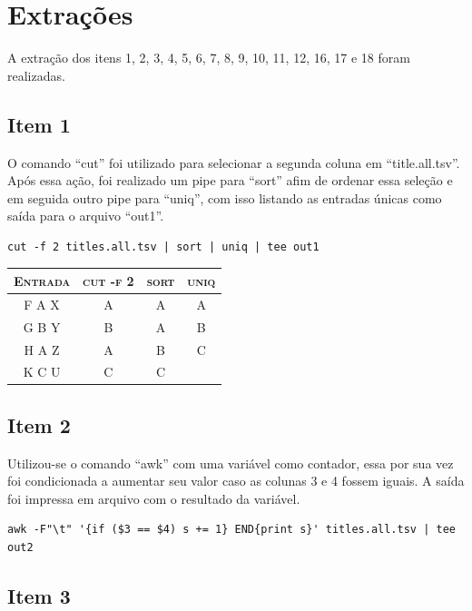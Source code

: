 \documentclass[12pt]{article}
\begin{document}
\section{Extrações}

A extração dos itens 1, 2, 3, 4, 5, 6, 7, 8, 9, 10, 11, 12, 16, 17 e 18 foram realizadas.

\subsection*{Item 1}

O comando ``cut'' foi utilizado para selecionar a segunda coluna em ``title.all.tsv''. Após essa ação, foi realizado um pipe para ``sort'' afim de ordenar essa seleção e em seguida outro pipe para ``uniq'', com isso listando as entradas únicas como saída para o arquivo ``out1''.

\pagebreak

\begin{verbatim}
cut -f 2 titles.all.tsv | sort | uniq | tee out1 
\end{verbatim}

\begin{table}[!h]
    \begin{tabular}{ c c c c }
        \textsc{Entrada} & \textsc{cut -f 2} & \textsc{sort} & \textsc{uniq} \\ 
        \hline
        F A X & A & A & A \\ 
        G B Y & B & A & B \\
        H A Z & A & B & C \\
        K C U & C & C &   \\
    \end{tabular}
\end{table}

\subsection*{Item 2}

Utilizou-se o comando ``awk'' com uma variável como contador, essa por sua vez foi condicionada a aumentar seu valor caso as colunas 3 e 4 fossem iguais. A saída foi impressa em arquivo com o resultado da variável.

\begin{verbatim}
awk -F"\t" '{if ($3 == $4) s += 1} END{print s}' titles.all.tsv | tee out2
\end{verbatim}

\subsection*{Item 3}
\end{document}
